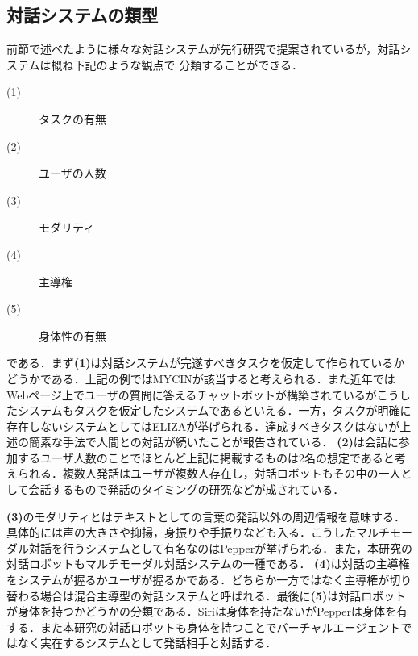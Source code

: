 \subsection{対話システムの類型}
\label{対話システムの類型}
前節で述べたように様々な対話システムが先行研究で提案されているが，対話システムは概ね下記のような観点で
分類することができる．
\begin{description}
    \item[(1)] タスクの有無
    \item[(2)] ユーザの人数
    \item[(3)] モダリティ
    \item[(4)] 主導権
    \item[(5)] 身体性の有無
\end{description}
である．まず\textbf{(1)}は対話システムが完遂すべきタスクを仮定して作られているかどうかである．上記の例ではMYCINが該当すると考えられる．また近年ではWebページ上でユーザの質問に答えるチャットボットが構築されているがこうしたシステムもタスクを仮定したシステムであるといえる．一方，タスクが明確に存在しないシステムとしてはELIZAが挙げられる．達成すべきタスクはないが上述の簡素な手法で人間との対話が続いたことが報告されている\cite{weizenbaum1966eliza}．
\textbf{(2)}は会話に参加するユーザ人数のことでほとんど上記に掲載するものは2名の想定であると考えられる．複数人発話はユーザが複数人存在し，対話ロボットもその中の一人として会話するもので発話のタイミングの研究などが成されている\cite{oki2012}．

\textbf{(3)}のモダリティとはテキストとしての言葉の発話以外の周辺情報を意味する．具体的には声の大きさや抑揚，身振りや手振りなども入る．こうしたマルチモーダル対話を行うシステムとして有名なのはPepperが挙げられる．また，本研究の対話ロボットもマルチモーダル対話システムの一種である．
\textbf{(4)}は対話の主導権をシステムが握るかユーザが握るかである．どちらか一方ではなく主導権が切り替わる場合は混合主導型の対話システムと呼ばれる\cite{higashinaka2020python}．最後に\textbf{(5)}は対話ロボットが身体を持つかどうかの分類である．Siriは身体を持たないがPepperは身体を有する．また本研究の対話ロボットも身体を持つことでバーチャルエージェントではなく実在するシステムとして発話相手と対話する．

